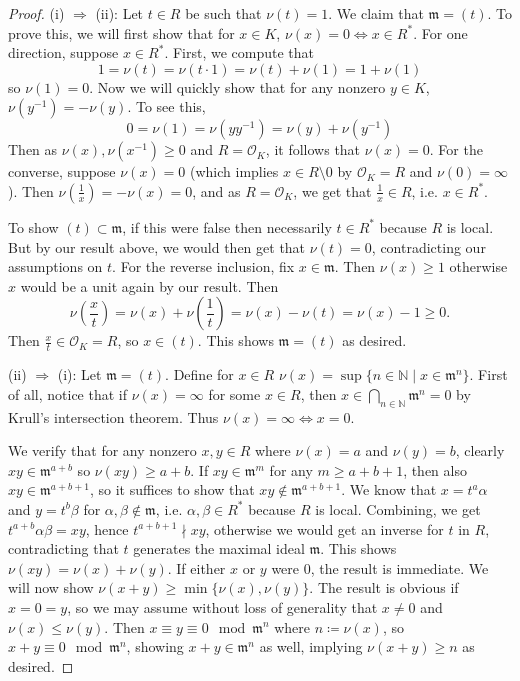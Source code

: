 \documentclass{article}
\theoremstyle{customplain}
\theoremstyle{customdef}
\newcommand{\N}{\mathbb{N}}
\newcommand{\calO}{\mathcal{O}}
\newcommand{\frkm}{\mathfrak{m}}
\theoremstyle{definition} %
\renewcommand{\le}{\leqslant}
\renewcommand{\ge}{\geqslant}
\begin{document}
\begin{proof}
    (i) $\Rightarrow$ (ii): Let $t\in R$ be such that $\nu(t)=1.$ We claim that $\frkm = (t).$ To prove this, we will first show that for $x\in K$, $\nu(x)=0 \iff x\in R^*.$ For one direction, suppose $x\in R^*.$ First, we compute that
    \[
    1=\nu(t)=\nu(t\cdot 1)= \nu(t)+\nu(1)=1+\nu(1)
    \]
    so $\nu(1)=0.$ Now we will quickly show that for any nonzero $y\in K$, $\nu(y^{-1})=-\nu(y).$ To see this,
    \[
    0=\nu(1) = \nu(y y^{-1}) = \nu(y)+\nu(y^{-1})
    \]
    Then as $\nu(x), \nu(x^{-1})\ge 0 $ and $R= \calO_K$, it follows that $\nu(x)=0.$ For the converse, suppose $\nu(x)=0$ (which implies $x\in R\setminus 0$ by $\calO_K=R$ and $\nu(0)=\infty$). Then $\nu(\frac{1}{x}) = -\nu(x) = 0$, and as $R=\calO_K$, we get that $\frac{1}{x}\in R$, i.e. $x\in R^*.$

    To show $(t)\subset \frkm$, if this were false then necessarily $t\in R^*$ because $R$ is local. But by our result above, we would then get that $\nu(t)=0$, contradicting our assumptions on $t.$ For the reverse inclusion, fix $x\in \frkm.$ Then $\nu(x)\ge 1$ otherwise $x$ would be a unit again by our result. Then
    \[
    \nu(\frac{x}{t})=\nu(x)+\nu(\frac{1}{t})=\nu(x)-\nu(t)=\nu(x)-1 \ge 0.
    \]
    Then $\frac{x}{t}\in \calO_K = R$, so $x\in (t).$ This shows $\frkm = (t)$ as desired.

    \vspace{0.1in}
    (ii) $\Rightarrow$ (i):
    Let $\frkm = (t).$ Define for $x\in R$ $\nu(x) = \sup \{n \in \N \mid x \in \frkm^n\}$. First of all, notice that if $\nu(x)=\infty$ for some $x\in R$, then $x\in \bigcap_{n \in \N} \frkm^n = 0$ by Krull's intersection theorem. Thus $\nu(x)=\infty \iff x=0.$
    
    We verify that for any nonzero $x,y\in R$ where $\nu(x)=a$ and $\nu(y)=b$, clearly $xy\in \frkm^{a+b}$ so $\nu(xy)\ge a+b$. If $xy \in \frkm^m$ for any $m\ge a+b+1$, then also $xy \in \frkm^{a+b+1}$, so it suffices to show that $xy\notin \frkm^{a+b+1}.$ We know that $x=t^a\alpha$ and $y= t^b \beta$ for $\alpha, \beta \notin \frkm$, i.e. $\alpha, \beta \in R^*$ because $R$ is local. Combining, we get $t^{a+b} \alpha \beta=xy$, hence $t^{a+b+1}\nmid xy$, otherwise we would get an inverse for $t$ in $R$, contradicting that $t$ generates the maximal ideal $\frkm.$ This shows $\nu(xy)=\nu(x)+\nu(y).$ If either $x$ or $y$ were $0$, the result is immediate. We will now show $\nu(x+y)\ge \min \{\nu(x), \nu(y)\}$. The result is obvious if $x=0=y$, so we may assume without loss of generality that $x\ne 0$ and $\nu(x)\le \nu(y)$. Then $x\equiv y \equiv 0 \mod \frkm^n$ where $n\coloneqq \nu(x)$, so $x+y \equiv 0 \mod \frkm^n$, showing $x+y\in \frkm^n$ as well, implying $\nu(x+y) \ge n$ as desired.
    

\end{proof}
\end{document}
